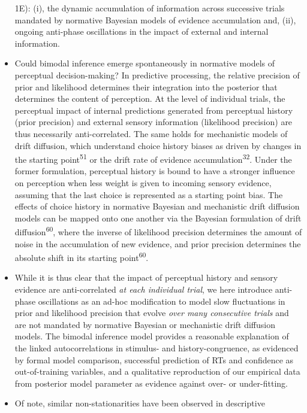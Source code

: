 \documentclass[
]{article}
\begin{document}
\begin{itemize}
  1E): (i), the dynamic accumulation of information across successive
  trials mandated by normative Bayesian models of evidence accumulation
  and, (ii), ongoing anti-phase oscillations in the impact of external
  and internal information.
\item
  Could bimodal inference emerge spontaneously in normative models of
  perceptual decision-making? In predictive processing, the relative
  precision of prior and likelihood determines their integration into
  the posterior that determines the content of perception. At the level
  of individual trials, the perceptual impact of internal predictions
  generated from perceptual history (prior precision) and external
  sensory information (likelihood precision) are thus necessarily
  anti-correlated. The same holds for mechanistic models of drift
  diffusion, which understand choice history biases as driven by changes
  in the starting point\textsuperscript{51} or the drift rate of
  evidence accumulation\textsuperscript{32}. Under the former
  formulation, perceptual history is bound to have a stronger influence
  on perception when less weight is given to incoming sensory evidence,
  assuming that the last choice is represented as a starting point bias.
  The effects of choice history in normative Bayesian and mechanistic
  drift diffusion models can be mapped onto one another via the Bayesian
  formulation of drift diffusion\textsuperscript{60}, where the inverse
  of likelihood precision determines the amount of noise in the
  accumulation of new evidence, and prior precision determines the
  absolute shift in its starting point\textsuperscript{60}.
\item
  While it is thus clear that the impact of perceptual history and
  sensory evidence are anti-correlated \emph{at each individual trial},
  we here introduce anti-phase oscillations as an ad-hoc modification to
  model slow fluctuations in prior and likelihood precision that evolve
  \emph{over many consecutive trials} and are not mandated by normative
  Bayesian or mechanistic drift diffusion models. The bimodal inference
  model provides a reasonable explanation of the linked autocorrelations
  in stimulus- and history-congruence, as evidenced by formal model
  comparison, successful prediction of RTs and confidence as
  out-of-training variables, and a qualitative reproduction of our
  empirical data from posterior model parameter as evidence against
  over- or under-fitting.
\item
  Of note, similar non-stationarities have been observed in descriptive

\end{itemize}
\end{document}
